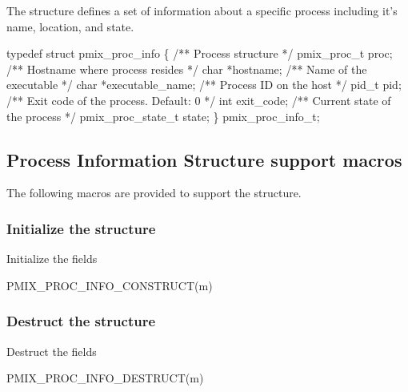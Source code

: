 The  structure defines a set of information about a specific process including it's name, location, and state.

\cspecificstart
\begin{codepar}
typedef struct pmix_proc_info \{
    /** Process structure */
    pmix_proc_t proc;
    /** Hostname where process resides */
    char *hostname;
    /** Name of the executable */
    char *executable_name;
    /** Process ID on the host */
    pid_t pid;
    /** Exit code of the process. Default: 0 */
    int exit_code;
    /** Current state of the process */
    pmix_proc_state_t state;
\} pmix_proc_info_t;
\end{codepar}
\cspecificend


\subsection{Process Information Structure support macros}

The following macros are provided to support the  structure.

\subsubsection{Initialize the  structure}

Initialize the  fields

\cspecificstart
\begin{codepar}
PMIX_PROC_INFO_CONSTRUCT(m)
\end{codepar}
\cspecificend

\begin{arglist}
\end{arglist}

\subsubsection{Destruct the  structure}

Destruct the  fields

\cspecificstart
\begin{codepar}
PMIX_PROC_INFO_DESTRUCT(m)
\end{codepar}
\cspecificend

